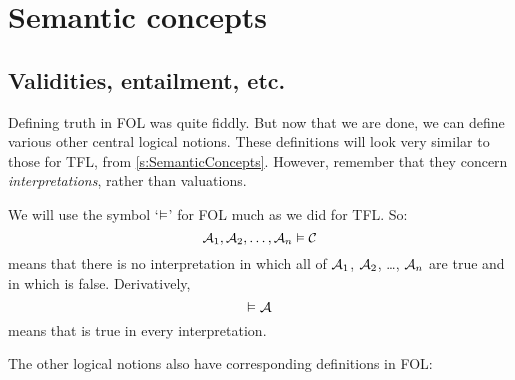 \chapter{Semantic concepts}

\section{Validities, entailment, etc.}

Defining truth in FOL was quite fiddly. But now that we are done, we can define various other central logical notions. These definitions will look very similar to those for TFL, from \cref{s:SemanticConcepts}. However, remember that they concern \emph{interpretations}, rather than valuations.

We will use the symbol `$\vDash$' for FOL much as we did for TFL. So:
	$$\mathcal{A}_1, \mathcal{A}_2, \ldots, \mathcal{A}_n \vDash\mathcal{C}$$
means that there is no interpretation in which all of $\mathcal{A}_1$, $\mathcal{A}_2$, \dots, $\mathcal{A}_n$ are true and in which  is false. Derivatively,
	$$\vDash\mathcal{A}$$
means that  is true in every interpretation.

The other logical notions also have corresponding definitions in FOL:

